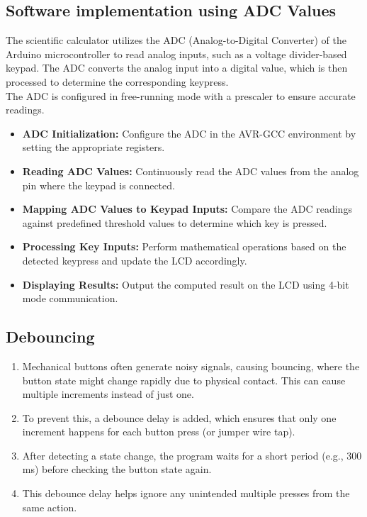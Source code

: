 \documentclass[journal]{IEEEtran}
\begin{document}
\subsection{Software implementation using ADC Values}
The scientific calculator utilizes the ADC (Analog-to-Digital Converter) of the Arduino microcontroller to read analog inputs, such as a voltage divider-based keypad. The ADC converts the analog input into a digital value, which is then processed to determine the corresponding keypress.\\
The ADC is configured in free-running mode with a prescaler to ensure accurate readings.

\begin{itemize}
    \item \textbf{ADC Initialization:} Configure the ADC in the AVR-GCC environment by setting the appropriate registers.
    \item \textbf{Reading ADC Values:} Continuously read the ADC values from the analog pin where the keypad is connected.
    \item \textbf{Mapping ADC Values to Keypad Inputs:} Compare the ADC readings against predefined threshold values to determine which key is pressed.
    \item \textbf{Processing Key Inputs:} Perform mathematical operations based on the detected keypress and update the LCD accordingly.
    \item \textbf{Displaying Results:} Output the computed result on the LCD using 4-bit mode communication.
\end{itemize}

\subsection{Debouncing}
\begin{enumerate}
    \item Mechanical buttons often generate noisy signals, causing bouncing, where the button state might change rapidly due to physical contact. This can cause multiple increments instead of just one.
    \item To prevent this, a debounce delay is added, which ensures that only one increment happens for each button press (or jumper wire tap).
    \item After detecting a state change, the program waits for a short period (e.g., 300 ms) before checking the button state again.
    \item This debounce delay helps ignore any unintended multiple presses from the same action.
\end{enumerate}
\end{document}
